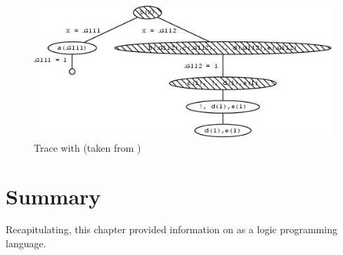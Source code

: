 \documentclass[thesis-solanki.tex]{subfiles}
\begin{document}
\begin{figure}[H]
\centering
\includegraphics[scale = .95]{prologcutrace.jpeg}
\caption{Trace with  (taken from \cite{website:cutprologunionedu})}
\label{fig:Trace with cut}
\end{figure}

\section{Summary}
Recapitulating, this chapter provided information on  as a logic programming language.

\ifMain\ifDraft
\begin{scope}
  \nolinenumbers
  \enotesize
  \par
  \begin{singlespace}
  \setlength{\parskip}{12pt plus 2pt minus 1pt}
  \theendnotes
  \par
  \end{singlespace}
\end{scope}
\fi\fi
\end{document}
